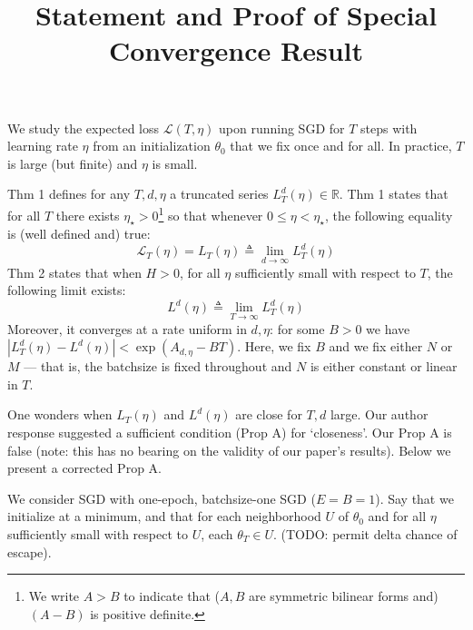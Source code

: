 \documentclass[12pt]{colt2021} %
\newcommand{\RR}{\mathbb{R}}
\begin{document}
\title{Statement and Proof of Special Convergence Result}
    We study the expected loss ${\mathcal L}(T, \eta)$ upon running SGD for $T$ steps with
    learning rate $\eta$ from an initialization $\theta_0$ that we fix once and
    for all.  In practice, $T$ is large (but finite) and $\eta$ is small.

    Thm 1 defines for any $T, d, \eta$ a truncated series $L^d_T(\eta)\in
    \RR$.  Thm 1 states that for all $T$ there exists $\eta_\star>0$\footnote{
        We write $A>B$ to indicate that ($A, B$ are symmetric bilinear forms
        and) $(A-B)$ is positive definite.
    } so that whenever $0\leq \eta<\eta_\star$, the following equality is (well
    defined and) true:
    $$
        {\mathcal L}_T(\eta) = L_T(\eta) \triangleq \lim_{d\to \infty} L^d_T(\eta)
    $$
    Thm 2 states that when $H>0$, for all $\eta$ sufficiently small with
    respect to $T$, the following limit exists:
    $$
        L^d(\eta) \triangleq \lim_{T\to \infty} L^d_T(\eta)
    $$
    Moreover, it converges at a rate uniform in $d, \eta$: for some $B>0$
    we have $|L^d_T(\eta) - L^d(\eta)| < \exp(A_{d,\eta} - BT)$.
    Here, we fix $B$ and we fix either $N$ or $M$ --- that is, the batchsize is 
    fixed throughout and $N$ is either constant or linear in $T$.

    One wonders when $L_T(\eta)$ and $L^d(\eta)$ are close for $T,d$ large.
    Our author response suggested a sufficient condition (Prop A) for
    `closeness'.  Our Prop A is false (note: this has no bearing on the
    validity of our paper's results).  Below we present a corrected Prop A.

    We consider SGD with one-epoch, batchsize-one SGD ($E=B=1$).  Say that we
    initialize at a minimum, and that for each neighborhood $U$ of $\theta_0$
    and for all $\eta$ sufficiently small with respect to $U$, each $\theta_T\in U$.
    (TODO: permit delta chance of escape).
\end{document}
